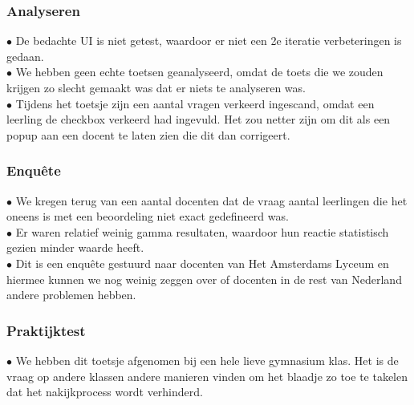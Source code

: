 \documentclass[12pt]{article}
\begin{document}
\begin{multicols}{2}
\begin{minipage}{\linewidth}
\subsubsection{Analyseren}
$\bullet$ De bedachte UI is niet getest, waardoor er niet een 2e iteratie verbeteringen is gedaan.\\
$\bullet$ We hebben geen echte toetsen geanalyseerd, omdat de toets die we zouden krijgen zo slecht gemaakt was dat er niets te analyseren was.\\
$\bullet$ Tijdens het toetsje zijn een aantal vragen verkeerd ingescand, omdat een leerling de checkbox verkeerd had ingevuld. Het zou netter zijn om dit als een popup aan een docent te laten zien die dit dan corrigeert.\\
\end{minipage}
\begin{minipage}{\linewidth}

\subsubsection{Enquête}
$\bullet$ We kregen terug van een aantal docenten dat de vraag aantal leerlingen die het oneens is met een beoordeling niet exact gedefineerd was.\\
$\bullet$ Er waren relatief weinig gamma resultaten, waardoor hun reactie statistisch gezien minder waarde heeft.\\
$\bullet$ Dit is een enquête gestuurd naar docenten van Het Amsterdams Lyceum en hiermee kunnen we nog weinig zeggen over of docenten in de rest van Nederland andere problemen hebben.\\
\end{minipage}
\begin{minipage}{\linewidth}
\subsubsection{Praktijktest}
$\bullet$ We hebben dit toetsje afgenomen bij een hele lieve gymnasium klas. Het is de vraag op andere klassen andere manieren vinden om het blaadje zo toe te takelen dat het nakijkprocess wordt verhinderd.\\
\end{minipage}
\begin{minipage}{\linewidth}
    

\end{minipage}
\end{multicols}
\end{document}
